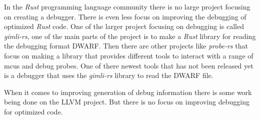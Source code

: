 

In the \emph{Rust} programming language community there is no large project focusing on creating a debugger.
There is even less focus on improving the debugging of optimized \emph{Rust} code.
One of the larger project focusing on debugging is called \emph{gimli-rs}, one of the main parts of the project is to make a \emph{Rust} library for reading the debugging format \gls{DWARF}.
Then there are other projects like \emph{probe-rs} that focus on making a library that provides different tools to interact with a range of \glspl{mcu} and debug probes.
One of there newest tools that has not been released yet is a debugger that uses the \emph{gimli-rs} library to read the \gls{DWARF} file.


When it comes to improving generation of debug information there is some work being done on the \gls{LLVM} project.
But there is no focus on improving debugging for optimized code.

